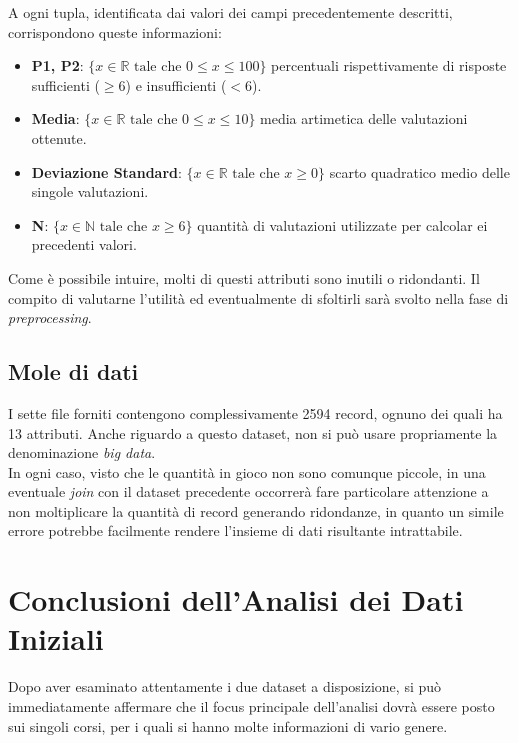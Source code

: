 A ogni tupla, identificata dai valori dei campi precedentemente descritti, corrispondono queste informazioni:

\begin{itemize}
	\item \textbf{P1, P2}: $ \{ x \in \mathbb{R} \text{ tale che } 0 \leq x \leq 100 \} $  percentuali rispettivamente di risposte sufficienti ($ \geq 6$) e insufficienti ($ < 6$).
	\item \textbf{Media}:  $ \{ x \in \mathbb{R} \text{ tale che } 0 \leq x \leq 10 \} $ media artimetica delle valutazioni ottenute.
	\item \textbf{Deviazione Standard}:  $ \{ x \in \mathbb{R} \text{ tale che } x \geq 0\} $ scarto quadratico medio delle singole valutazioni.
	\item \textbf{N}:  $ \{ x \in \mathbb{N} \text{ tale che } x \geq 6\} $ quantità di valutazioni utilizzate per calcolar ei precedenti valori.
\end{itemize}

Come è possibile intuire, molti di questi attributi sono inutili o ridondanti. Il compito di valutarne l'utilità ed eventualmente di sfoltirli sarà svolto nella fase di \textit{preprocessing}.

\subsection{Mole di dati}

I sette file forniti contengono complessivamente 2594 record, ognuno dei quali ha 13 attributi. Anche riguardo a questo dataset, non si può usare propriamente la denominazione \textit{big data}.\\

In ogni caso, visto che le quantità in gioco non sono comunque piccole, in una eventuale \textit{join} con il dataset precedente occorrerà fare particolare attenzione a non moltiplicare la quantità di record generando ridondanze, in quanto un simile errore potrebbe facilmente rendere l'insieme di dati risultante intrattabile.

\section{Conclusioni dell'Analisi dei Dati Iniziali}

Dopo aver esaminato attentamente i due dataset a disposizione, si può immediatamente affermare che il focus principale dell'analisi dovrà essere posto sui singoli corsi, per i quali si hanno molte informazioni di vario genere. \\


